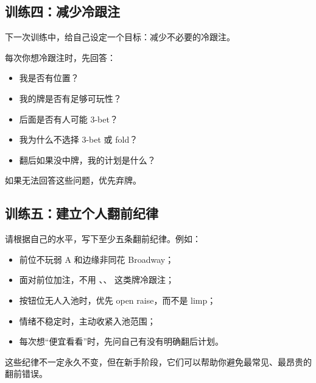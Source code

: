 \subsection*{训练四：减少冷跟注}

下一次训练中，给自己设定一个目标：减少不必要的冷跟注。

每次你想冷跟注时，先回答：

\begin{itemize}
\item 我是否有位置？
\item 我的牌是否有足够可玩性？
\item 后面是否有人可能 3-bet？
\item 我为什么不选择 3-bet 或 fold？
\item 翻后如果没中牌，我的计划是什么？
\end{itemize}

如果无法回答这些问题，优先弃牌。

\subsection*{训练五：建立个人翻前纪律}

请根据自己的水平，写下至少五条翻前纪律。例如：

\begin{itemize}
\item 前位不玩弱 A 和边缘非同花 Broadway；
\item 面对前位加注，不用 、、 这类牌冷跟注；
\item 按钮位无人入池时，优先 open raise，而不是 limp；
\item 情绪不稳定时，主动收紧入池范围；
\item 每次想“便宜看看”时，先问自己有没有明确翻后计划。
\end{itemize}

这些纪律不一定永久不变，但在新手阶段，它们可以帮助你避免最常见、最昂贵的翻前错误。
